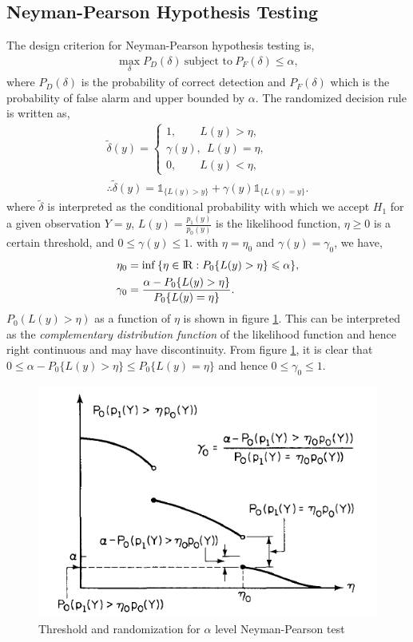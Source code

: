 \documentclass[a4paper,english,12pt]{article}
\begin{document}
\subsection{Neyman-Pearson Hypothesis Testing}
The design criterion for Neyman-Pearson hypothesis testing is, 
\begin{eqnarray}
\max_{\delta}P_{D}(\delta)~\mbox{subject to}~P_{F}(\delta)\leqslant\alpha,
\end{eqnarray}
where $P_D(\delta)$ is the probability of correct detection and $P_F(\delta)$ which is the probability of false alarm and upper bounded by $\alpha$. The randomized decision rule is written as,
\begin{eqnarray}
\tilde{\delta}(y)= \begin{cases} 1,   \hspace{25pt}L(y)>\eta,\\
                   \gamma(y),~~L(y)=\eta,\\
                   0,   \hspace{25pt}L(y)<\eta,
                  \end{cases}\\
\therefore \tilde{\delta}(y)= \mathds{1}_{\{L(y)>y\}}+\gamma(y)\mathds{1}_{\{L(y)=y\}}. \label{NP}               
\end{eqnarray}
where $\tilde{\delta}$ is interpreted as the conditional probability with which we accept $H_1$ for a given observation $Y=y$, $L(y)=\frac{p_1(y)}{p_0(y)}$ is the likelihood function, $\eta\geq0$ is a certain threshold, and $0\leq\gamma(y)\leq1$. with $\eta= \eta_0$ and $\gamma(y) = \gamma_0$, we have,
\begin{align} 
\eta_{0}   &= \inf{\{\eta\in{\rm I\!R}:P_{0}\{L(y)>\eta\}\leqslant\alpha\}}, \\
\gamma_{0} &= \frac{\alpha-P_{0}\{L(y)>\eta\}}{P_{0}\{L(y)=\eta\}}.    
\end{align}
$P_0(L(y)>\eta)$ as a function of $\eta$ is shown in figure \ref{fig:Neyman1}. This can be interpreted as the \textit{complementary distribution function} of the likelihood function and hence right continuous and may have discontinuity. From figure \ref{fig:Neyman1}, it is clear that $0\leq\alpha-P_{0}\{L(y)>\eta\}\leq P_{0}\{L(y)=\eta\}$ and hence $0\leq\gamma_0\leq1$.
\begin{figure}[h]
\centering
\includegraphics[width=0.6\linewidth]{Figures/Neyman}
\caption{Threshold and randomization for $\alpha$ level Neyman-Pearson test}
\label{fig:Neyman1}
\end{figure}
\end{document}
